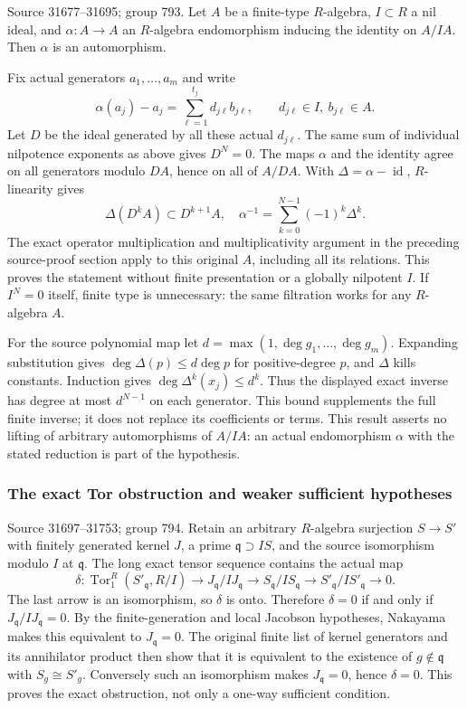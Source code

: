 Source 31677--31695; group 793. Let \(A\) be a finite-type \(R\)-algebra, \(I\subset R\) a nil ideal, and \(\alpha:A\to A\) an \(R\)-algebra endomorphism inducing the identity on \(A/IA\). Then \(\alpha\) is an automorphism.

Fix actual generators \(a_1,\ldots,a_m\) and write \[
\alpha(a_j)-a_j=\sum_{\ell=1}^{t_j}d_{j\ell}b_{j\ell},\qquad
d_{j\ell}\in I,\ b_{j\ell}\in A.
\] Let \(D\) be the ideal generated by all these actual \(d_{j\ell}\). The same sum of individual nilpotence exponents as above gives \(D^N=0\). The maps \(\alpha\) and the identity agree on all generators modulo \(DA\), hence on all of \(A/DA\). With \(\Delta=\alpha-\operatorname{id}\), \(R\)-linearity gives \[
\Delta(D^kA)\subset D^{k+1}A,\quad
\alpha^{-1}=\sum_{k=0}^{N-1}(-1)^k\Delta^k.
\] The exact operator multiplication and multiplicativity argument in the preceding source-proof section apply to this original \(A\), including all its relations. This proves the statement without finite presentation or a globally nilpotent \(I\). If \(I^N=0\) itself, finite type is unnecessary: the same filtration works for any \(R\)-algebra \(A\).

For the source polynomial map let \(d=\max(1,\deg g_1,\ldots,\deg g_m)\). Expanding substitution gives \(\deg\Delta(p)\le d\deg p\) for positive-degree \(p\), and \(\Delta\) kills constants. Induction gives \(\deg\Delta^k(x_j)\le d^k\). Thus the displayed exact inverse has degree at most \(d^{N-1}\) on each generator. This bound supplements the full finite inverse; it does not replace its coefficients or terms. This result asserts no lifting of arbitrary automorphisms of \(A/IA\): an actual endomorphism \(\alpha\) with the stated reduction is part of the hypothesis.

\subsubsection{The exact Tor obstruction and weaker sufficient hypotheses}\label{algebra-proof-035-the-exact-tor-obstruction-and-weaker-sufficient-hypotheses}

Source 31697--31753; group 794. Retain an arbitrary \(R\)-algebra surjection \(S\to S'\) with finitely generated kernel \(J\), a prime \(\mathfrak q\supset IS\), and the source isomorphism modulo \(I\) at \(\mathfrak q\). The long exact tensor sequence contains the actual map \[
\delta:\operatorname{Tor}_1^R(S'_{\mathfrak q},R/I)
\longrightarrow J_{\mathfrak q}/IJ_{\mathfrak q}
\longrightarrow S_{\mathfrak q}/IS_{\mathfrak q}
\longrightarrow S'_{\mathfrak q}/IS'_{\mathfrak q}\longrightarrow0.
\] The last arrow is an isomorphism, so \(\delta\) is onto. Therefore \(\delta=0\) if and only if \(J_{\mathfrak q}/IJ_{\mathfrak q}=0\). By the finite-generation and local Jacobson hypotheses, Nakayama makes this equivalent to \(J_{\mathfrak q}=0\). The original finite list of kernel generators and its annihilator product then show that it is equivalent to the existence of \(g\notin\mathfrak q\) with \(S_g\cong S'_g\). Conversely such an isomorphism makes \(J_{\mathfrak q}=0\), hence \(\delta=0\). This proves the exact obstruction, not only a one-way sufficient condition.

